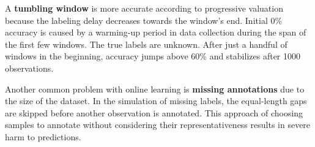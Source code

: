 
A \textbf{tumbling window} is more accurate according to progressive valuation because the labeling delay decreases towards the window's end. Initial 0\% accuracy is caused by a warming-up period in data collection during the span of the first few windows. The true labels are unknown. After just a handful of windows in the beginning, accuracy jumps above 60\% and stabilizes after 1000 observations.

Another common problem with online learning is \textbf{missing annotations} due to the size of the dataset. In the simulation of missing labels, the equal-length gaps are skipped before another observation is annotated. This approach of choosing samples to annotate without considering their representativeness results in severe harm to predictions. 

 
